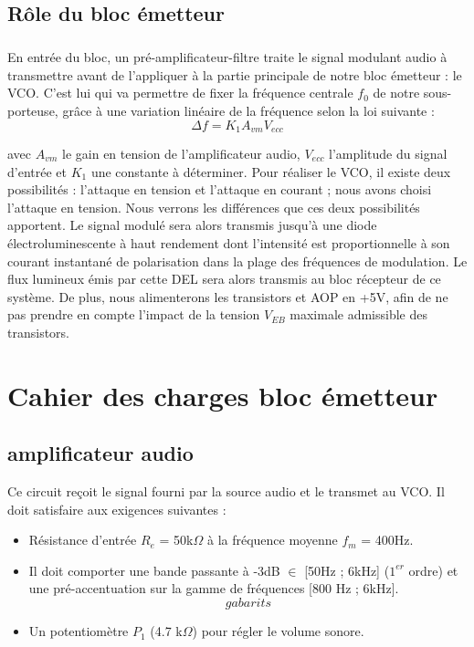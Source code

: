 \documentclass[a4paper]{report}
\begin{document}
\newpage

\section{Rôle du bloc émetteur}

\paragraph{}

En entrée du bloc, un pré-amplificateur-filtre traite le signal modulant audio à transmettre avant de l'appliquer à la partie principale de notre bloc émetteur : le VCO. C'est lui qui va permettre de fixer la fréquence centrale $f_0$ de notre sous-porteuse, grâce à une variation linéaire de la fréquence selon la loi suivante :\\ 
$$  \Delta f = K_1A_{vm}V_{ecc}$$

avec  $A_{vm}$ le gain en tension de l'amplificateur audio, $V_{ecc}$ l'amplitude du signal d'entrée et $K_1$ une constante à déterminer.
Pour réaliser le VCO, il existe deux possibilités : l'attaque en tension et l'attaque en courant ; nous avons choisi l'attaque en tension. Nous verrons les différences que ces deux possibilités apportent. Le signal modulé sera alors transmis jusqu'à une diode électroluminescente à haut rendement dont l'intensité est proportionnelle à son courant instantané de polarisation dans la plage des fréquences de modulation. Le flux lumineux émis par cette DEL sera alors transmis au bloc récepteur de ce système.  De plus, nous alimenterons les transistors et AOP en +5V, afin de ne pas prendre en compte l'impact de la tension $V_{EB}$ maximale admissible des transistors.

\chapter{Cahier des charges bloc émetteur}

\section{amplificateur audio}

Ce circuit reçoit le signal fourni par la source audio et le transmet au VCO. Il doit satisfaire aux exigences suivantes :  
\begin{itemize}
	\item Résistance d'entrée $R_e$ = 50k$\Omega$ à la fréquence moyenne $f_m$ = 400Hz.

	\item Il doit comporter une bande passante à -3dB $\in$ [50Hz ; 6kHz] ($1^{er}$ ordre) et une pré-accentuation sur la gamme de fréquences [800 Hz ; 6kHz].\\


$$gabarits$$

	\item Un potentiomètre $P_1$ (4.7 k$\Omega$) pour régler le volume sonore.
	
\end{itemize}
\end{document}

